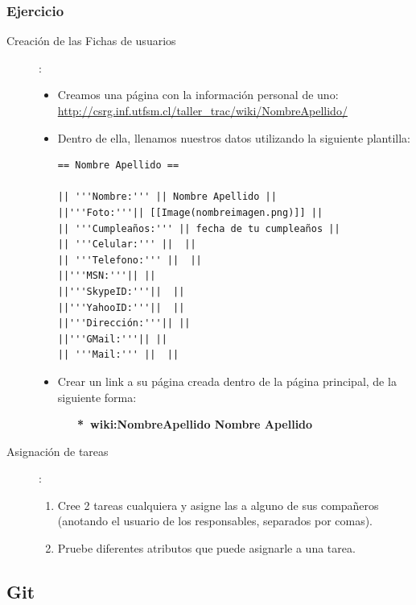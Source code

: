 \subsubsection{Ejercicio}
\begin{description}
  \item[Creación de las Fichas de usuarios]:
  \begin{itemize}
    \item Creamos una página con la información personal de uno:\\
    \url{http://csrg.inf.utfsm.cl/taller_trac/wiki/NombreApellido/}
    \item Dentro de ella, llenamos nuestros datos utilizando la siguiente
    plantilla:\\
\begin{verbatim}
== Nombre Apellido ==

|| '''Nombre:''' || Nombre Apellido ||
||'''Foto:'''|| [[Image(nombreimagen.png)]] ||
|| '''Cumpleaños:''' || fecha de tu cumpleaños ||
|| '''Celular:''' ||  ||
|| '''Telefono:''' ||  ||
||'''MSN:'''|| ||
||'''SkypeID:'''||  ||
||'''YahooID:'''||  ||
||'''Dirección:'''|| ||
||'''GMail:'''|| ||
|| '''Mail:''' ||  ||
\end{verbatim}
    \item Crear un link a su página creada dentro de la página principal, de
    la siguiente forma:
        \begin{center}\textbf{\ \ \ *\ \lbrack wiki:NombreApellido Nombre Apellido\rbrack}\end{center}

  \end{itemize}

\item[Asignación de tareas]:
\begin{enumerate}
    \item Cree 2 tareas cualquiera y asigne las a alguno de sus compañeros
    (anotando el usuario de los responsables, separados por comas).
    \item Pruebe diferentes atributos que puede asignarle a una tarea.
\end{enumerate}

\end{description}

\newpage

\subsection{Git}

